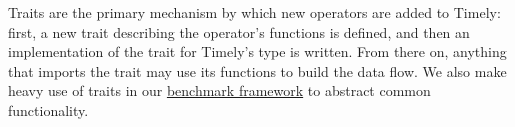 Traits are the primary mechanism by which new operators are added to Timely: first, a new trait describing the operator's functions is defined, and then an implementation of the trait for Timely's  type is written. From there on, anything that imports the trait may use its functions to build the data flow. We also make heavy use of traits in our \hyperref[section:framework]{benchmark framework} to abstract common functionality.

